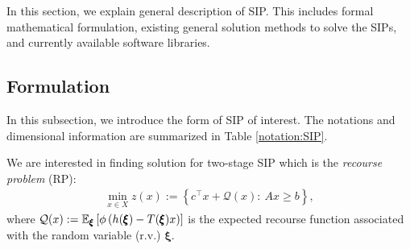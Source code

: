 In this section, we explain general description of SIP. This includes formal mathematical formulation, existing general solution methods to solve the SIPs, and currently available software libraries.
\subsection{Formulation}
In this subsection, we introduce the form of SIP of interest. The notations and dimensional information are summarized in Table \ref{notation:SIP}. 

We are interested in finding solution for two-stage SIP which is the \textit{recourse problem} (RP): 
\begin{align}
\min_{x\in X} z(x):={\left\{c^\top x + \mathcal{Q}(x):\ Ax\ge b\right\}}, \label{eq:SIP_1}
\end{align}
where $\mathcal{Q}(x):=\operatorname*{\mathbb{E}}_{\pmb{\xi}}\left[ \phi\left( h(\pmb{\xi})-T(\pmb{\xi})x \right) \right]$ is the expected recourse function associated with the random variable (r.v.) $\pmb{\xi}$. 

